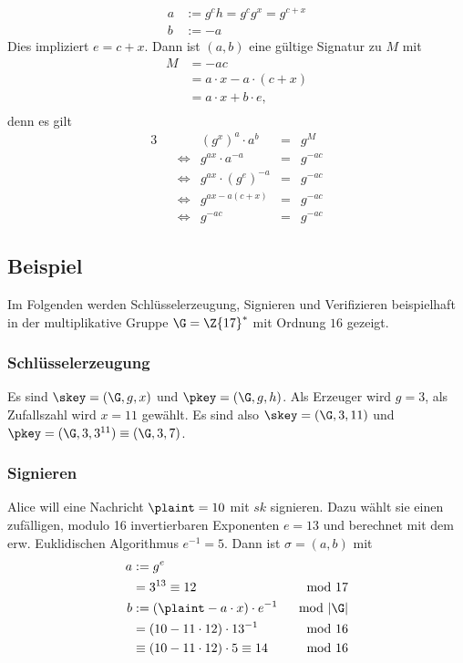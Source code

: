 \begin{description}
\begin{align*}
	a &:= g^ch = g^cg^x = g^{c+x}\\
	b &:= -a
	\end{align*}
        Dies impliziert $e=c+x$. 
	Dann ist $(a, b)$ eine gültige Signatur zu $M$ mit
	\begin{align*}
          M &= -ac\\
            &= a \cdot x - a \cdot (c + x)\\
            &= a \cdot x + b \cdot e,\\
	\end{align*}
        denn es gilt 
        \begin{alignat*}{3}
          &&                 & (g^x)^a\cdot a^b       &= &g^M\\
          && \Leftrightarrow & g^{ax} \cdot a^{-a}     &= &g^{-ac}\\
          && \Leftrightarrow & g^{ax} \cdot (g^e)^{-a} &= &g^{-ac}\\
          && \Leftrightarrow & g^{ax-a(c+x)}            &= &g^{-ac}\\
          && \Leftrightarrow & g^{-ac}                 &= &g^{-ac}
        \end{alignat*}
      \end{description}
      \subsection{Beispiel}
      Im Folgenden werden Schlüsselerzeugung, Signieren und Verifizieren beispielhaft
      in der multiplikative Gruppe $\G = \Z{17}^{*}$ mit Ordnung $16$ gezeigt. 
      \subsubsection*{Schlüsselerzeugung}
      Es sind $\skey = (\G, g, x)$ und $\pkey = (\G, g, h)$. Als
      Erzeuger wird $g=3$, als Zufallszahl wird $x=11$
      gewählt. Es sind also $\skey = (\G, 3, 11)$ und $\pkey = (\G, 3,
      3^{11})\equiv (\G, 3, 7)$.
      \subsubsection*{Signieren}
      Alice will eine Nachricht $\plaint = 10$ mit $sk$ signieren. Dazu
      wählt sie einen zufälligen, modulo 16 invertierbaren Exponenten
      $e= 13$ und berechnet mit dem erw. Euklidischen Algorithmus
      $e^{-1}=5$. Dann ist $\sigma =  (a, b)$ mit 
      \begin{align*}
       a &:= g^e &\\
         &= 3^{13} \equiv 12 & \mod 17\\
       b &:= (\plaint-a  \cdot x) \cdot e^{-1} & \mod |\G|\\
          &= (10 - 11 \cdot 12) \cdot 13^{-1} & \mod 16\\
          &\equiv (10 - 11\cdot 12) \cdot 5 \equiv 14 & \mod 16
      \end{align*}
